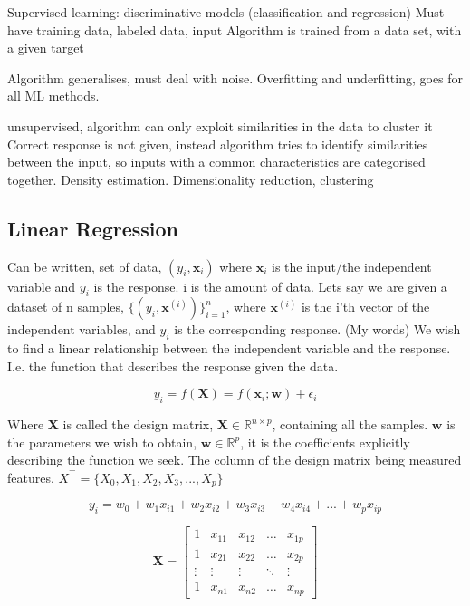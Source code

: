 Supervised learning: discriminative models (classification and regression) 
Must have training data, labeled data, input 
Algorithm is trained from a data set, with a given target


Algorithm generalises, must deal with noise. Overfitting and underfitting, goes for all ML methods. 

unsupervised, algorithm can only exploit similarities in the data to cluster it
Correct response is not given, instead algorithm tries to identify similarities between the input, so inputs with a common characteristics are categorised together. Density estimation.
Dimensionality reduction, clustering

\subsection{Linear Regression}

Can be written, set of data, $(y_i, \mathbf{x}_i)$ where $\mathbf{x}_i$ is the input/the independent variable and $y_i$ is the response. i is the amount of data. 
Lets say we are given a dataset of n samples, $\{ (y_i, \mathbf{x}^{(i)})\}_{i=1}^n$, where $\mathbf{x}^{(i)}$ is the i'th vector of the independent variables, and $y_i$ is the corresponding response. (My words) We wish to find a linear relationship between the independent variable and the response. I.e. the function that describes the response given the data. 

\begin{equation}
y_i = f(\mathbf{X}) = f(\mathbf{x}_i;\mathbf{w}) + \epsilon_i
\end{equation}

Where $\mathbf{X}$ is called the design matrix, $\mathbf{X} \in \mathbb{R}^{n \times p}$, containing all the samples. $\mathbf{w}$ is the parameters we wish to obtain, $\mathbf{w} \in \mathbb{R}^p$, it is the coefficients explicitly describing the function we seek. The column of the design matrix being measured features. $X^{\top} = \{X_0, X_1, X_2, X_3,..., X_p\}$

\begin{equation}
y_i = w_0 + w_1 x_{i1} + w_2 x_{i2} + w_3 x_{i3} + w_4 x_{i4} + ... + w_p x_{ip}
\end{equation}

\begin{equation}
\mathbf{X} = 
\begin{bmatrix}
1 & x_{11} & x_{12} & \dots  & x_{1p} \\
1 & x_{21} & x_{22} & \dots  & x_{2p} \\
\vdots & \vdots & \vdots & \ddots & \vdots \\
1 & x_{n1} & x_{n2} & \dots  & x_{np}
\end{bmatrix}
\end{equation}

